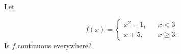 \documentclass{ximera}
\author{Gregory Hartman \and Matthew Carr}
\begin{document}
\begin{exercise}



Let

\[
f(x) = \left\{
                 \begin{array}{ccc} x^2-1, & & x < 3 \\
                 x+5, & & x\geq 3.
                  \end{array}
         \right.
\]
Is $f$ continuous everywhere? 

\begin{multipleChoice}
\end{multipleChoice}

\end{exercise}
\end{document}
